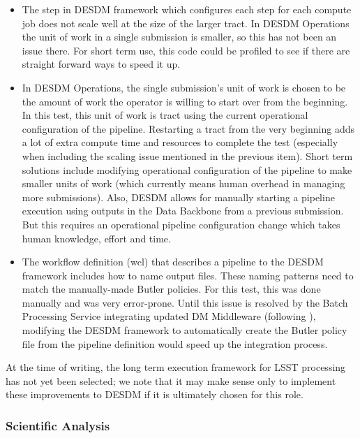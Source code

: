 \documentclass[DM,lsstdraft,STR,toc]{lsstdoc}
\begin{document}
\begin{itemize}
  \item{
    The step in DESDM framework which configures each step for each compute job does not scale well at the size of the larger tract.
    In DESDM Operations the unit of work in a single submission is smaller, so this has not been an issue there.
    For short term use, this code could be profiled to see if there are straight forward ways to speed it up.
  }

  \item{
    In DESDM Operations, the single submission's unit of work is chosen to be the amount of work the operator is willing to start over from the beginning.
    In this test, this unit of work is tract using the current operational configuration of the pipeline.
    Restarting a tract from the very beginning adds a lot of extra compute time and resources to complete the test (especially when including the scaling issue
mentioned in the previous item).
    Short term solutions include modifying operational configuration of the pipeline to make smaller units of work (which currently means human overhead in managing more submissions).
    Also, DESDM allows for manually starting a pipeline execution using outputs in the Data Backbone from a previous submission.
    But this requires an operational pipeline configuration change which takes human knowledge, effort and time.
  }

  \item{
    The workflow definition (wcl) that describes a pipeline to the DESDM framework includes how to name output files.
    These naming patterns need to match the manually-made Butler policies.
    For this test, this was done manually and was very error-prone.
    Until this issue is resolved by the Batch Processing Service integrating
    updated DM Middleware (following ), modifying the DESDM framework to automatically create the Butler policy file from the pipeline definition would speed up the integration process.
  }

\end{itemize}

At the time of writing, the long term execution framework for LSST processing has not yet been selected; we note that it may make sense only to implement these improvements to DESDM if it is ultimately chosen for this role.

\subsubsection{Scientific Analysis}
\end{document}
